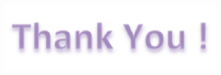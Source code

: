 \documentclass{beamer}
\begin{document}
\begin{frame}
  \begin{figure}[h]
    \centering
    \includegraphics[width=0.5\linewidth]{figures/thankyou.png}
  \end{figure}
\end{frame}
\end{document}
